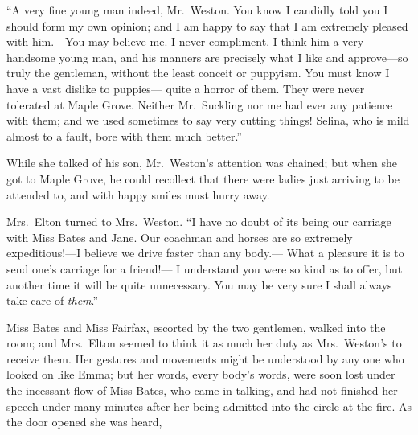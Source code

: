``A very fine young man indeed, Mr.\ Weston.  You know I candidly told
you I should form my own opinion; and I am happy to say that I am
extremely pleased with him.---You may believe me.  I never compliment.
I think him a very handsome young man, and his manners are precisely
what I like and approve---so truly the gentleman, without the least
conceit or puppyism.  You must know I have a vast dislike to puppies---%
quite a horror of them.  They were never tolerated at Maple Grove.
Neither Mr.\ Suckling nor me had ever any patience with them; and we
used sometimes to say very cutting things!  Selina, who is mild almost
to a fault, bore with them much better.''

While she talked of his son, Mr.\ Weston's attention was chained;
but when she got to Maple Grove, he could recollect that there were
ladies just arriving to be attended to, and with happy smiles must
hurry away.

Mrs.\ Elton turned to Mrs.\ Weston.  ``I have no doubt of its being
our carriage with Miss Bates and Jane.  Our coachman and horses are
so extremely expeditious!---I believe we drive faster than any body.---%
What a pleasure it is to send one's carriage for a friend!---%
I understand you were so kind as to offer, but another time it
will be quite unnecessary.  You may be very sure I shall always
take care of \emph{them}.''

Miss Bates and Miss Fairfax, escorted by the two gentlemen,
walked into the room; and Mrs.\ Elton seemed to think it as much
her duty as Mrs.\ Weston's to receive them.  Her gestures and
movements might be understood by any one who looked on like Emma;
but her words, every body's words, were soon lost under the
incessant flow of Miss Bates, who came in talking, and had not
finished her speech under many minutes after her being admitted
into the circle at the fire.  As the door opened she was heard,

